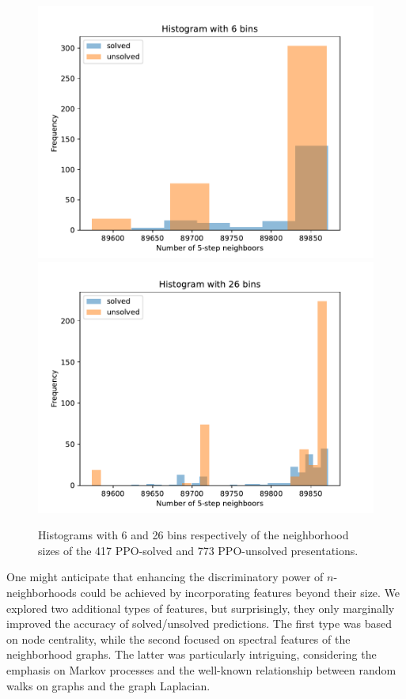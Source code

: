 \begin{figure}
	\centering
    \includegraphics[scale=.34]{fig/prime_histogram_rl.pdf}
	\includegraphics[scale=.34]{fig/prime_histogram_rl2.pdf}
	\caption{Histograms with 6 and 26 bins respectively of the neighborhood sizes of the 417 PPO-solved and 773 PPO-unsolved presentations.}
	\label{fig:prime_histogram}
\end{figure}

\medskip

One might anticipate that enhancing the discriminatory power of $n$-neighborhoods could be achieved by incorporating features beyond their size. We explored two additional types of features, but surprisingly, they only marginally improved the accuracy of solved/unsolved predictions. The first type was based on node centrality, while the second focused on spectral features of the neighborhood graphs. The latter was particularly intriguing, considering the emphasis on Markov processes and the well-known relationship between random walks on graphs and the graph Laplacian.